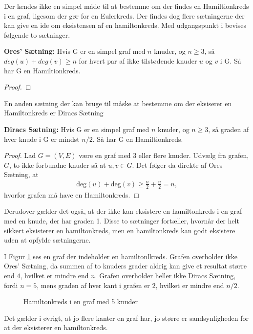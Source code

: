 Der kendes ikke en simpel måde til at bestemme om der findes en Hamiltionkreds i en graf, ligesom der gør for en Eulerkreds. 
Der findes dog flere sætningerne der kan give en ide om eksistensen af en hamiltonkreds. Med udgangspunkt i  bevises følgende to sætninger.

\begin{thm} \label{ores_thm}
\textbf{Ores' Sætning:} 
Hvis G er en simpel graf med $n$ knuder, og $n\geq3$, så\\ $deg(u)+deg(v)\geq n$ for hvert par af ikke tilstødende knuder $u$ og $v$ i G. 
Så har G en Hamiltionkreds. 
\end{thm}

\begin{proof}

\end{proof}

En anden sætning der kan bruge til måske at bestemme om der eksiserer en Hamiltonkreds er Diracs Sætning 

\begin{thm} \label{diracs_thm}
\textbf{Diracs Sætning:} 
Hvis G er en simpel graf med $n$ knuder, og $n\geq3$, så graden af hver knude i G er mindst $n/2$. 
Så har G en Hamiltionkreds.  
\end{thm}

\begin{proof}
Lad $G=(V,E)$ være en graf med 3 eller flere knuder. Udvælg fra grafen, $G$, to ikke-forbundne knuder så at $u,v \in G$. Det følger da direkte af Ores Sætning, at
\begin{align*}
\textrm{deg}(u) + \textrm{deg}(v) \geq \frac{n}{2} + \frac{n}{2} = n,
\end{align*}
hvorfor grafen må have en Hamiltonkreds.
\end{proof}

Derudover gælder det også, at der ikke kan eksistere en hamiltonkreds i en graf med en knude, der har graden 1. 
Disse to sætninger fortæller, hvornår der helt sikkert eksisterer en hamiltonkreds, men en hamiltonkreds kan godt eksistere uden at opfylde sætningerne. 

\begin{exmp}
I Figur \ref{pentagon} ses en graf der indeholder en hamiltonlkreds.
Grafen overholder ikke Ores' Sætning, da summen af to knuders grader aldrig kan give et resultat større end $4$, hvilket er mindre end $n$.
Grafen overholder heller ikke Diracs Sætning, fordi $n=5$, mens graden af hver kant i grafen er $2$, hvilket er mindre end $n/2$.


\begin{figure}
\centering

\caption{Hamiltonkreds i en graf med 5 knuder}
\label{pentagon}
\end{figure}

\end{exmp}

Det gælder i øvrigt, at jo flere kanter en graf har, jo større er sandsynligheden for at der eksisterer en hamiltonkreds. 